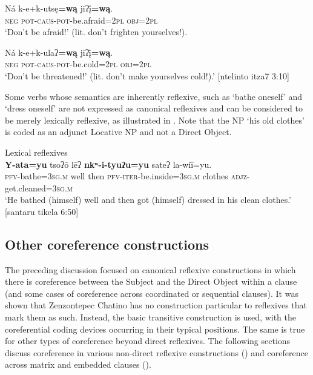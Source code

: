 \documentclass[output=paper]{../langscibook}
\begin{document}
\ex
\gll Ná   k-e+k-utsę\textbf{=wą}   jiʔį̄\textbf{=wą}.\\
     \textsc{neg}  \textsc{pot}{}-\textsc{caus}{}-\textsc{pot}{}-be.afraid=\textsc{2pl}  \textsc{obj}=\textsc{2pl}\\
\glt ‘Don’t be afraid!’ (lit. don’t frighten yourselves!).


\ex
\gll Ná  k-e+k-ulaʔ\textbf{=wą}  jiʔį̄\textbf{=wą}.\\
     \textsc{neg}  \textsc{pot}{}-\textsc{caus}{}-\textsc{pot}{}-be.cold=\textsc{2pl}  \textsc{obj}=\textsc{2pl}\\
\glt ‘Don’t be threatened!’ (lit. don’t make yourselves cold!).’ [ntelinto itza7 3:10]
\z
\z


Some verbs whose semantics are inherently reflexive, such as ‘bathe oneself’ and ‘dress oneself’ are not expressed as canonical reflexives and can be considered to be merely lexically reflexive, as illustrated in . Note that the NP ‘his old clothes’ is coded as an adjunct Locative NP and not a Direct Object.


\ea\label{ex:campbell:29}
{Lexical reflexives}\\
\gll \textbf{Y-ata=yu}  tsoʔō  lēʔ  \textbf{nkʷ-i-tyuʔu=yu}  sateʔ  la-wíī=yu.\\
     \textsc{pfv-}bathe=\textsc{3sg.m}  well  then  \textsc{pfv-iter-}be.inside=\textsc{3sg.m}  clothes  \textsc{adjz-}get.cleaned=3\textsc{sg.m}\\
\glt ‘He bathed (himself) well and then got (himself) dressed in his clean clothes.’ [santaru tikela 6:50]
\z

\subsection{Other coreference constructions}
\label{sec:campbell:4.2}

The preceding discussion focused on canonical reflexive constructions in which there is coreference between the Subject and the Direct Object within a clause (and some cases of coreference across coordinated or sequential clauses). It was shown that Zenzontepec Chatino has no construction particular to reflexives that mark them as such. Instead, the basic transitive construction is used, with the coreferential coding devices occurring in their typical positions. The same is true for other types of coreference beyond direct reflexives. The following sections discuss coreference in various non-direct reflexive constructions () and coreference across matrix and embedded clauses ().
\end{document}
